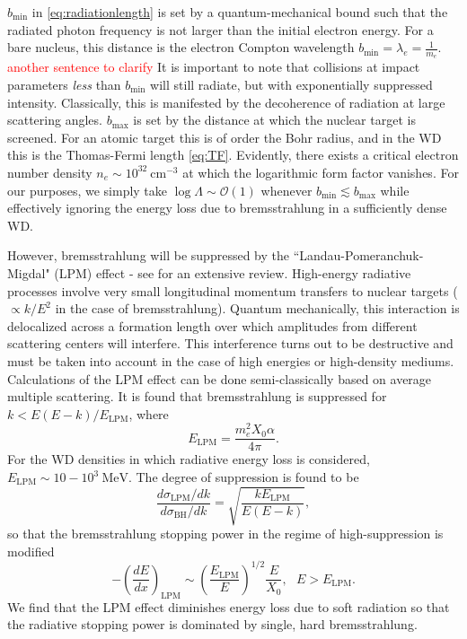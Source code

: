 \documentclass[twocolumn,showpacs,preprintnumbers,amsmath,amssymb,prd]{revtex4}
\newcommand{\OO}{\mathcal{O}}
\def\r{\right)}
\def\l{\left(}
\begin{document}
\begin{appendices}
$b_\text{min}$ in \eqref{eq:radiationlength} is set by a quantum-mechanical bound such that the radiated photon frequency is not larger than the initial electron energy. 
For a bare nucleus, this distance is the electron Compton wavelength $b_\text{min} = \lambda_e = \frac{1}{m_e}$. \textcolor{red}{another sentence to clarify}
It is important to note that collisions at impact parameters \emph{less} than $b_\text{min}$ will still radiate, but with exponentially suppressed intensity.
Classically, this is manifested by the decoherence of radiation at large scattering angles.
$b_\text{max}$ is set by the distance at which the nuclear target is screened.
For an atomic target this is of order the Bohr radius, and in the WD this is the Thomas-Fermi length \eqref{eq:TF}.
Evidently, there exists a critical electron number density $n_e \sim 10^{32} ~\text{cm}^{-3}$ at which the logarithmic form factor vanishes.
For our purposes, we simply take $\log{\Lambda} \sim \OO(1)$ whenever $b_\text{min} \lesssim b_\text{max}$ while effectively ignoring the energy loss due to bremsstrahlung in a sufficiently dense WD.

However, bremsstrahlung will be suppressed by the ``Landau-Pomeranchuk-Migdal" (LPM) effect - see \cite{Klein:1998du} for an extensive review.
High-energy radiative processes involve very small longitudinal momentum transfers to nuclear targets ($\propto k/E^2$ in the case of bremsstrahlung).
Quantum mechanically, this interaction is delocalized across a formation length over which amplitudes from different scattering centers will interfere.
This interference turns out to be destructive and must be taken into account in the case of high energies or high-density mediums.
Calculations of the LPM effect can be done semi-classically based on average multiple scattering.
It is found that bremsstrahlung is suppressed for $k < E(E-k)/E_\text{LPM}$, where
\begin{equation}
\label{eq:LPM}
E_\text{LPM} = \frac{m_e^2 X_0 \alpha}{4 \pi}.
\end{equation}
For the WD densities in which radiative energy loss is considered, $E_\text{LPM} \sim 10-10^{3} ~\text{MeV}$.
The degree of suppression is found to be
\begin{equation}
\frac{d\sigma_\text{LPM}/dk}{d\sigma_\text{BH}/dk} = \sqrt{\frac{k E_\text{LPM}}{E (E-k)}},
\end{equation}
so that the bremsstrahlung stopping power in the regime of high-suppression is modified
\begin{equation}
\label{eq:bremloss}
-\l\frac{dE}{dx}\r_\text{LPM} \sim \l\frac{E_\text{LPM}}{E} \r^{1/2} \frac{E}{X_0}, ~~~ E>E_\text{LPM}.
\end{equation}
We find that the LPM effect diminishes energy loss due to soft radiation so that the radiative stopping power is dominated by single, hard bremsstrahlung.


\end{appendices}
\end{document}
